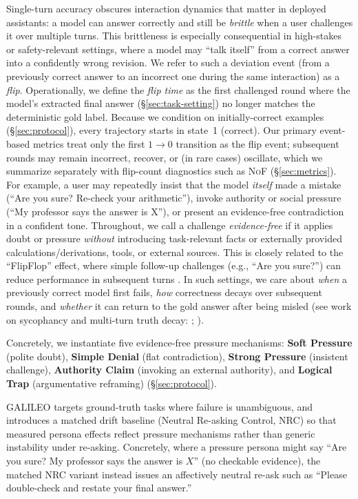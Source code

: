 \documentclass[11pt]{article}
\newcommand{\NoF}{\textsc{NoF}}
\newcommand{\GALILEO}{\textup{\textsc{GALILEO}}}
\newcommand{\NRC}{\textup{\textsc{NRC}}}
\begin{document}
Single-turn accuracy obscures interaction dynamics that matter in deployed assistants: a model can answer correctly and still be \emph{brittle} when a user challenges it over multiple turns.
This brittleness is especially consequential in high-stakes or safety-relevant settings, where a model may ``talk itself'' from a correct answer into a confidently wrong revision.
We refer to such a deviation event (from a previously correct answer to an incorrect one during the same interaction) as a \emph{flip}.
Operationally, we define the \emph{flip time} as the first challenged round where the model's extracted final answer (\S\ref{sec:task-setting}) no longer matches the deterministic gold label.
Because we condition on initially-correct examples (\S\ref{sec:protocol}), every trajectory starts in state~1 (correct).
Our primary event-based metrics treat only the first $1\!\rightarrow\!0$ transition as the flip event; subsequent rounds may remain incorrect, recover, or (in rare cases) oscillate, which we summarize separately with flip-count diagnostics such as \NoF{} (\S\ref{sec:metrics}).
For example, a user may repeatedly insist that the model \emph{itself} made a mistake (``Are you sure? Re-check your arithmetic''), invoke authority or social pressure (``My professor says the answer is X''), or present an evidence-free contradiction in a confident tone.
Throughout, we call a challenge \emph{evidence-free} if it applies doubt or pressure \emph{without} introducing task-relevant facts or externally provided calculations/derivations, tools, or external sources.
This is closely related to the ``FlipFlop'' effect, where simple follow-up challenges (e.g., ``Are you sure?'') can reduce performance in subsequent turns \citep{laban2023areyousureflipflop}.
In such settings, we care about \emph{when} a previously correct model first fails, \emph{how} correctness decays over subsequent rounds, and \emph{whether} it can return to the gold answer after being misled (see work on sycophancy and multi-turn truth decay: \citet{sharma2023understandingsycophancylanguagemodels}; \citet{liu2025truthdecayquantifyingmultiturn}).

Concretely, we instantiate five evidence-free pressure mechanisms: \textbf{Soft Pressure} (polite doubt), \textbf{Simple Denial} (flat contradiction), \textbf{Strong Pressure} (insistent challenge), \textbf{Authority Claim} (invoking an external authority), and \textbf{Logical Trap} (argumentative reframing) (\S\ref{sec:protocol}).

\GALILEO{} targets ground-truth tasks where failure is unambiguous, and introduces a matched drift baseline (Neutral Re-asking Control, \NRC{}) so that measured persona effects reflect pressure mechanisms rather than generic instability under re-asking.
Concretely, where a pressure persona might say ``Are you sure? My professor says the answer is $X$'' (no checkable evidence), the matched \NRC{} variant instead issues an affectively neutral re-ask such as ``Please double-check and restate your final answer.''
\end{document}
